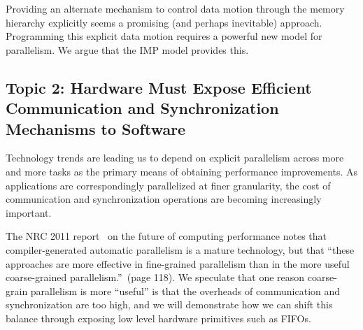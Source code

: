 Providing an alternate mechanism to control data motion through the
memory hierarchy explicitly
seems a promising (and
perhaps inevitable) approach. Programming this explicit data motion
requires a powerful new model for parallelism. We argue that the
\ac{IMP} model provides this.
     
\begin{comment}
       Although it is unlikely that caches can (or should) be completely
       eliminated, alternate mechanisms are required to allow visibility
       and control of data motion through the memory hierarchy whenever
       possible, with caches retained (if at all) only to maintain a
       simple and familiar programming model for
       non-performance-critical memory accesses.
\end{comment}
     
     
\subsection*{Topic 2: Hardware Must Expose Efficient Communication and Synchronization Mechanisms to Software}

Technology trends are leading us to depend on explicit parallelism
across more and more tasks as the primary means of obtaining
performance improvements.  As applications are correspondingly
parallelized at finer granularity, the cost of communication and
synchronization operations are becoming increasingly important.
     
The NRC 2011 report~\cite{nrc2011} on the future of computing
performance notes that compiler-generated automatic parallelism is a
mature technology, but that ``these approaches are more effective in
fine-grained parallelism than in the more useful coarse-grained
parallelism.''~(page 118).  We speculate that one reason coarse-grain
parallelism is more ``useful'' is that the overheads of communication
and synchronization are too high, and we will demonstrate how we can
shift this balance through exposing low level hardware primitives such
as FIFOs.
